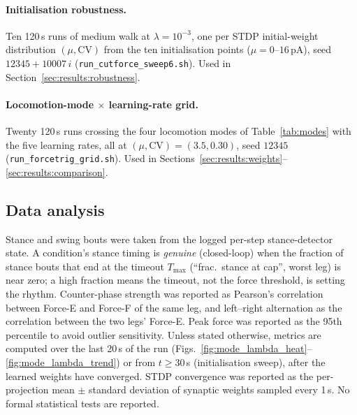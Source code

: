 \paragraph{Initialisation robustness.}
Ten 120\,s runs of medium walk at $\lambda=10^{-3}$, one per STDP
initial-weight distribution $(\mu,\mathrm{CV})$ from the ten
initialisation points ($\mu=0$--$16$\,pA), seed $12345+10007\,i$
(\texttt{run\_cutforce\_sweep6.sh}). Used in
Section~\ref{sec:results:robustness}.

\paragraph{Locomotion-mode $\times$ learning-rate grid.}
Twenty 120\,s runs crossing the four locomotion modes of
Table~\ref{tab:modes} with the five learning rates, all at
$(\mu,\mathrm{CV})=(3.5,0.30)$, seed $12345$
(\texttt{run\_forcetrig\_grid.sh}). Used in
Sections~\ref{sec:results:weights}--\ref{sec:results:comparison}.

\subsection{Data analysis}\label{sec:methods:analysis}
Stance and swing bouts were taken from the logged per-step stance-detector
state. A condition's stance timing is \emph{genuine} (closed-loop) when the
fraction of stance bouts that end at the timeout $T_{\max}$ (``frac.\
stance at cap'', worst leg) is near zero; a high fraction means the timeout,
not the force threshold, is setting the rhythm. Counter-phase strength was
reported as Pearson's correlation between Force-E and Force-F of the same
leg, and left--right alternation as the correlation between the two legs'
Force-E. Peak force was reported as the 95th percentile to avoid outlier
sensitivity. Unless stated otherwise, metrics are computed over the last
20\,s of the run (Figs.~\ref{fig:mode_lambda_heat}--\ref{fig:mode_lambda_trend})
or from $t\ge30$\,s (initialisation sweep), after the learned weights have
converged. STDP convergence was reported as the per-projection mean
$\pm$ standard deviation of synaptic weights sampled every 1\,s. No formal
statistical tests are reported.

